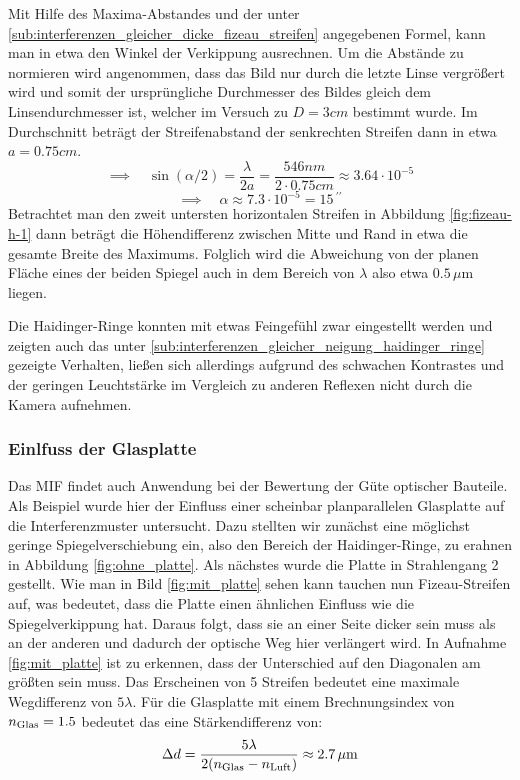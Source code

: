 			Mit Hilfe des Maxima-Abstandes und der unter \ref{sub:interferenzen_gleicher_dicke_fizeau_streifen} angegebenen Formel, kann man in etwa den Winkel der Verkippung ausrechnen.
			Um die Abstände zu normieren wird angenommen, dass das Bild nur durch die letzte Linse vergrößert wird und somit der ursprüngliche Durchmesser des Bildes gleich dem Linsendurchmesser ist, welcher im Versuch zu $D = 3 \unit{cm} $ bestimmt wurde.
			Im Durchschnitt beträgt der Streifenabstand der senkrechten Streifen dann in etwa $a = 0.75 \unit{cm}$.
			\[ \implies \quad \sin(\alpha /2) = \frac{\lambda}{2 a} = \frac{546 \unit{nm}}{2 \cdot 0.75 \unit{cm}} 
			\approx 3.64 \cdot 10^{-5} \]
			\[ \implies \quad \alpha \approx 7.3 \cdot 10^{-5} = 15\,^{\prime\prime} \]
			Betrachtet man den zweit untersten horizontalen Streifen in Abbildung \ref{fig:fizeau-h-1} dann beträgt die Höhendifferenz zwischen Mitte und Rand in etwa die gesamte Breite des Maximums.
			Folglich wird die Abweichung von der planen Fläche eines der beiden Spiegel auch in dem Bereich von $\lambda$ also etwa $0.5\,\mu\mathrm{m}$ liegen.

			Die Haidinger-Ringe konnten mit etwas Feingefühl zwar eingestellt werden und zeigten auch das unter \ref{sub:interferenzen_gleicher_neigung_haidinger_ringe} gezeigte Verhalten, ließen sich allerdings aufgrund des schwachen Kontrastes und der geringen Leuchtstärke im Vergleich zu anderen Reflexen nicht durch die Kamera aufnehmen.



		\subsubsection{Einlfuss der Glasplatte} %
		\label{ssub:einlfuss_der_glasplatte}

			Das MIF findet auch Anwendung bei der Bewertung der Güte optischer Bauteile.
			Als Beispiel wurde hier der Einfluss einer scheinbar planparallelen Glasplatte auf die Interferenzmuster untersucht.
			Dazu stellten wir zunächst eine möglichst geringe Spiegelverschiebung ein, also den Bereich der Haidinger-Ringe, zu erahnen in Abbildung \ref{fig:ohne_platte}.
			Als nächstes wurde die Platte in Strahlengang 2 gestellt.
			Wie man in Bild \ref{fig:mit_platte} sehen kann tauchen nun Fizeau-Streifen auf, was bedeutet, dass die Platte einen ähnlichen Einfluss wie die Spiegelverkippung hat.
			Daraus folgt, dass sie an einer Seite dicker sein muss als an der anderen und dadurch der optische Weg hier verlängert wird.
			In Aufnahme \ref{fig:mit_platte} ist zu erkennen, dass der Unterschied auf den Diagonalen am größten sein muss.
			Das Erscheinen von 5 Streifen bedeutet eine maximale Wegdifferenz von $5 \lambda$.
			Für die Glasplatte mit einem Brechnungsindex von $n_{\mathrm{Glas}}=1.5$ bedeutet das eine Stärkendifferenz von:
			\[ \Delta d = \frac{5 \lambda}{2 (n_{\mathrm{Glas}} - n_{\mathrm{Luft}}) } \approx 2.7\,\mu\mathrm{m} \]

